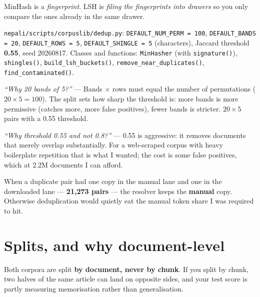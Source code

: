 \documentclass[11pt]{report}
\begin{document}
\begin{notebox}
MinHash is a \emph{fingerprint}. LSH is \emph{filing the fingerprints into
drawers} so you only compare the ones already in the same drawer.
\end{notebox}

\begin{tcolorbox}[colback=hindiblue!5,colframe=hindiblue!70,
  title={\textbf{My actual configuration}}]
\texttt{nepali/scripts/corpuslib/dedup.py}:
\texttt{DEFAULT\_NUM\_PERM = 100}, \texttt{DEFAULT\_BANDS = 20},
\texttt{DEFAULT\_ROWS = 5}, \texttt{DEFAULT\_SHINGLE = 5} (characters),
Jaccard threshold \textbf{0.55}, seed 20260817.
Classes and functions: \texttt{MinHasher} (with \texttt{signature()}),
\texttt{shingles()}, \texttt{build\_lsh\_buckets()},
\texttt{remove\_near\_duplicates()}, \texttt{find\_contaminated()}.
\end{tcolorbox}

\begin{notebox}
\textit{``Why 20 bands of 5?''} --- Bands $\times$ rows must equal the number of
permutations ($20 \times 5 = 100$). The split sets how sharp the threshold is:
more bands is more permissive (catches more, more false positives), fewer bands
is stricter. $20 \times 5$ pairs with a 0.55 threshold.

\medskip
\textit{``Why threshold 0.55 and not 0.8?''} --- 0.55 is aggressive: it removes
documents that merely overlap substantially. For a web-scraped corpus with
heavy boilerplate repetition that is what I wanted; the cost is some false
positives, which at 2.2M documents I can afford.
\end{notebox}

\begin{notebox}
When a duplicate pair had one copy in the manual lane and one in the downloaded
lane --- \textbf{21,273 pairs} --- the resolver keeps the \textbf{manual} copy.
Otherwise deduplication would quietly eat the manual token share I was required
to hit.
\end{notebox}

\section{Splits, and why document-level}

\begin{shortans}
Both corpora are split \textbf{by document, never by chunk}. If you split by
chunk, two halves of the same article can land on opposite sides, and your test
score is partly measuring memorisation rather than generalisation.
\end{shortans}
\end{document}
